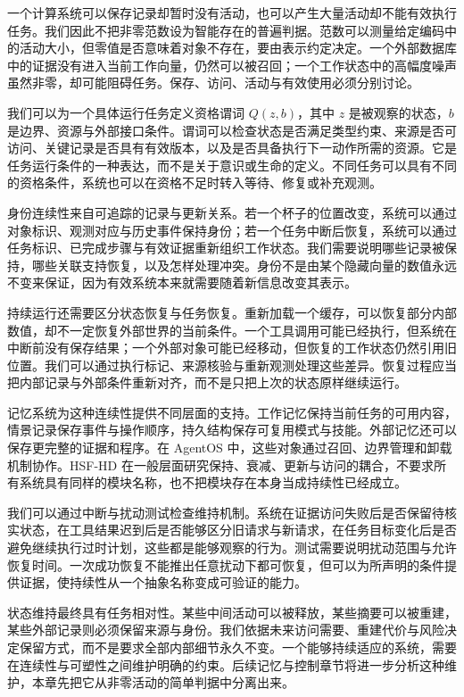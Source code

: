 一个计算系统可以保存记录却暂时没有活动，也可以产生大量活动却不能有效执行任务。我们因此不把非零范数设为智能存在的普遍判据。范数可以测量给定编码中的活动大小，但零值是否意味着对象不存在，要由表示约定决定。一个外部数据库中的证据没有进入当前工作向量，仍然可以被召回；一个工作状态中的高幅度噪声虽然非零，却可能阻碍任务。保存、访问、活动与有效使用必须分别讨论。

我们可以为一个具体运行任务定义资格谓词 $Q(z,b)$，其中 $z$ 是被观察的状态，$b$ 是边界、资源与外部接口条件。谓词可以检查状态是否满足类型约束、来源是否可访问、关键记录是否具有有效版本，以及是否具备执行下一动作所需的资源。它是任务运行条件的一种表达，而不是关于意识或生命的定义。不同任务可以具有不同的资格条件，系统也可以在资格不足时转入等待、修复或补充观测。

身份连续性来自可追踪的记录与更新关系。若一个杯子的位置改变，系统可以通过对象标识、观测对应与历史事件保持身份；若一个任务中断后恢复，系统可以通过任务标识、已完成步骤与有效证据重新组织工作状态。我们需要说明哪些记录被保持，哪些关联支持恢复，以及怎样处理冲突。身份不是由某个隐藏向量的数值永远不变来保证，因为有效系统本来就需要随着新信息改变其表示。

持续运行还需要区分状态恢复与任务恢复。重新加载一个缓存，可以恢复部分内部数值，却不一定恢复外部世界的当前条件。一个工具调用可能已经执行，但系统在中断前没有保存结果；一个外部对象可能已经移动，但恢复的工作状态仍然引用旧位置。我们可以通过执行标记、来源核验与重新观测处理这些差异。恢复过程应当把内部记录与外部条件重新对齐，而不是只把上次的状态原样继续运行。

记忆系统为这种连续性提供不同层面的支持。工作记忆保持当前任务的可用内容，情景记录保存事件与操作顺序，持久结构保存可复用模式与技能。外部记忆还可以保存更完整的证据和程序。在 AgentOS 中，这些对象通过召回、边界管理和卸载机制协作。HSF-HD 在一般层面研究保持、衰减、更新与访问的耦合，不要求所有系统具有同样的模块名称，也不把模块存在本身当成持续性已经成立。

我们可以通过中断与扰动测试检查维持机制。系统在证据访问失败后是否保留待核实状态，在工具结果迟到后是否能够区分旧请求与新请求，在任务目标变化后是否避免继续执行过时计划，这些都是能够观察的行为。测试需要说明扰动范围与允许恢复时间。一次成功恢复不能推出任意扰动下都可恢复，但可以为所声明的条件提供证据，使持续性从一个抽象名称变成可验证的能力。

状态维持最终具有任务相对性。某些中间活动可以被释放，某些摘要可以被重建，某些外部记录则必须保留来源与身份。我们依据未来访问需要、重建代价与风险决定保留方式，而不是要求全部内部细节永久不变。一个能够持续适应的系统，需要在连续性与可塑性之间维护明确的约束。后续记忆与控制章节将进一步分析这种维护，本章先把它从非零活动的简单判据中分离出来。

